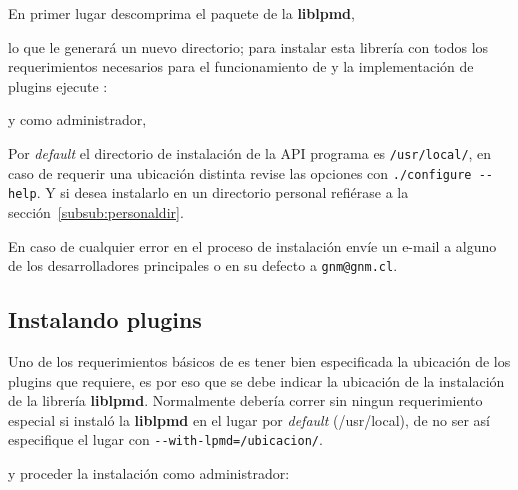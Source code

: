 % 
% 

En primer lugar descomprima el paquete de la \textbf{liblpmd},


lo que le generar\'a un nuevo directorio; para instalar esta librer\'ia con todos los requerimientos necesarios para el funcionamiento de {\lpmd} y la implementaci\'on de plugins ejecute :


y como administrador,




Por \textit{default} el directorio de instalaci\'on de la API programa es \verb|/usr/local/|, en caso de requerir una ubicaci\'on distinta revise las opciones con \verb|./configure --help|. Y si desea instalarlo en un directorio personal refi\'erase a la secci\'on~\ref{subsub:personaldir}.

En caso de cualquier error en el proceso de instalaci\'on env\'ie un e-mail a alguno de los desarrolladores principales o en su defecto a \verb|gnm@gnm.cl|.

\subsection{Instalando plugins}

Uno de los requerimientos b\'asicos de {\lpmd} es tener bien especificada la ubicaci\'on de los plugins que {\lpmd} requiere, es por eso que se debe indicar la ubicaci\'on de la instalaci\'on de la librer\'ia \textbf{liblpmd}. Normalmente deber\'ia correr sin ningun requerimiento especial si instal\'o la \textbf{liblpmd} en el lugar por \textit{default} (/usr/local), de no ser as\'i especifique el lugar con \verb|--with-lpmd=/ubicacion/|.


y proceder la instalaci\'on como administrador:


